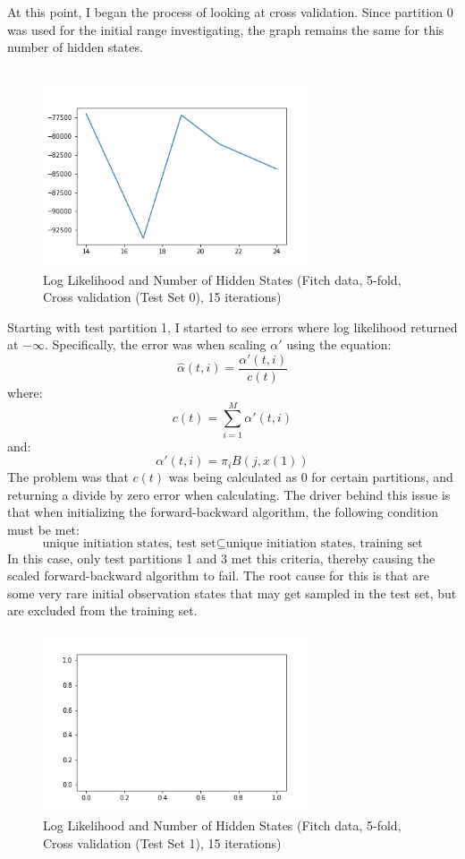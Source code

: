 \documentclass[a4paper, 11pt]{article}
\begin{document}
At this point, I began the process of looking at cross validation. Since partition 0 was used for the initial range investigating, the graph remains the same for this number of hidden states.\\
\\
\begin{figure}[!h]
	\caption{Log Likelihood and Number of Hidden States (Fitch data, 5-fold, Cross validation (Test Set 0), 15 iterations)}
	\includegraphics[width=8cm]{Cross_validation_test_0.png}
\end{figure}
Starting with test partition 1, I started to see errors where log likelihood returned at $-\infty$. Specifically, the error was when scaling $\alpha '$ using the equation\cite{deeplearning-scale}:
$$ \hat{\alpha}(t,i) = \frac{\alpha '(t,i)}{c(t)}$$
where:
$$c(t) = \sum_{i=1}^{M}\alpha '(t,i)$$
and:
$$\alpha '(t,i) = \pi_{i}B(j,x(1))$$
The problem was that $c(t)$ was being calculated as 0 for certain partitions, and returning a divide by zero error when calculating. The driver behind this issue is that when initializing the forward-backward algorithm, the following condition must be met:
$$\text{unique initiation states, test set} \subseteq \text{unique initiation states, training set}$$
In this case, only test partitions 1 and 3 met this criteria, thereby causing the scaled forward-backward algorithm to fail. The root cause for this is that are some very rare initial observation states that may get sampled in the test set, but are excluded from the training set.\\
\begin{figure}[!h]
	\caption{Log Likelihood and Number of Hidden States (Fitch data, 5-fold, Cross validation (Test Set 1), 15 iterations)}
	\includegraphics[width=8cm]{Cross_validation_test_1.png}
\end{figure}
\end{document}
